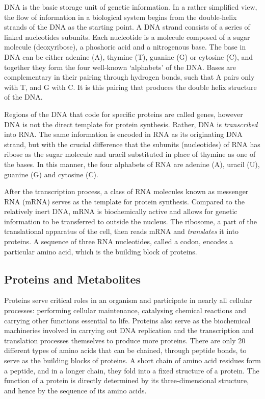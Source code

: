 DNA is the basic storage unit of genetic information. In a rather simplified view, the flow of information in a biological system begins from the double-helix strands of the DNA as the starting point. A DNA strand consists of a series of linked nucleotides subunits. Each nucleotide is a molecule composed of a sugar molecule (deoxyribose), a phoshoric acid and a nitrogenous base. The base in DNA can be either adenine (A), thymine (T), guanine (G) or cytosine (C), and together they form the four well-known `alphabets' of the DNA. Bases are complementary in their pairing through hydrogen bonds, such that A pairs only with T, and G with C. It is this pairing that produces the double helix structure of the DNA. 

Regions of the DNA that code for specific proteins are called genes, however DNA is not the direct template for protein synthesis. Rather, DNA is \emph{transcribed} into RNA. The same information is encoded in RNA as its originating DNA strand, but with the crucial difference that the subunits (nucleotides) of RNA has ribose as the sugar molecule and uracil substituted in place of thymine as one of the bases. In this manner, the four alphabets of RNA are adenine (A), uracil (U), guanine (G) and cytosine (C). 

After the transcription process, a class of RNA molecules known as messenger RNA (mRNA) serves as the template for protein synthesis. Compared to the relatively inert DNA, mRNA is biochemically active and allows for genetic information to be transferred to outside the nucleus. The ribosome, a part of the translational apparatus of the cell, then reads mRNA and \emph{translates} it into proteins. A sequence of three RNA nucleotides, called a codon, encodes a particular amino acid, which is the building block of proteins. 

\subsection{Proteins and Metabolites}

Proteins serve critical roles in an organism and participate in nearly all cellular processes: performing cellular maintenance, catalysing chemical reactions and carrying other functions essential to life. Proteins also serve as the biochemical machineries involved in carrying out DNA replication and the transcription and translation processes themselves to produce more proteins. There are only 20 different types of amino acids that can be chained, through peptide bonds, to serve as the building blocks of proteins. A short chain of amino acid residues form a peptide, and in a longer chain, they fold into a fixed structure of a protein. The function of a protein is directly determined by its three-dimensional structure, and hence by the sequence of its amino acids. 

